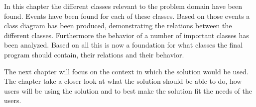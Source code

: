 In this chapter the different classes relevant to the problem domain have been found. Events have been found for each of these classes. 
Based on those events a class diagram has been produced, demonstrating the relations between the different classes. Furthermore the behavior of a number of important classes has been analyzed. Based on all this is now a foundation for what classes the final program should contain, their relations and their behavior.

The next chapter will focus on the context in which the solution would be used. The chapter take a closer look at what the solution should be able to do, how users will be using the solution and to best make the solution fit the needs of the users.














